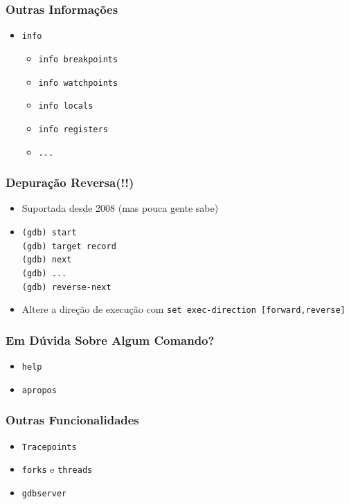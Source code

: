 \documentclass[xcolor=pdftex,dvipsnames,table,t]{beamer}
\begin{document}
\begin{frame}[fragile]
	\frametitle{Outras Informações}
	  \begin{itemize}
	    \item{\verb|info|}
	    \begin{itemize}
	      \item{\verb|info breakpoints|}
	      \item{\verb|info watchpoints|}
	      \item{\verb|info locals|}
	      \item{\verb|info registers|}
	      \item{\verb|...|}
	    \end{itemize}
	  \end{itemize}
\end{frame}

\begin{frame}[fragile]
	\frametitle{Depuração Reversa(!!)}
	  \begin{itemize}
	    \item{Suportada desde 2008 (mas pouca gente sabe)}
	    \item{\verb|(gdb) start| \\
		  \verb|(gdb) target record| \\
		  \verb|(gdb) next| \\
		  \verb|(gdb) ...| \\
		  \verb|(gdb) reverse-next|}
	    \item{Altere a direção de execução com \verb|set exec-direction [forward,reverse]|}
	  \end{itemize}
\end{frame}

\begin{frame}[fragile]
	\frametitle{Em Dúvida Sobre Algum Comando?}
	  \begin{itemize}
	    \item{\verb|help|}
	    \item{\verb|apropos|}
	  \end{itemize}
\end{frame}

\begin{frame}[fragile]
	\frametitle{Outras Funcionalidades}
	  \begin{itemize}
	    \item{\verb|Tracepoints|}
	    \item{\verb|forks| e \verb|threads|}
	    \item{\verb|gdbserver|}
	  \end{itemize}
\end{frame}
\end{document}
